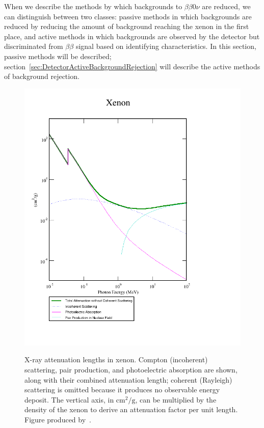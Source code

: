 When we describe the methods by which backgrounds to $\beta\beta 0\nu$ are reduced, we can distinguish between two classes: passive methods in which backgrounds are reduced by reducing the amount of background reaching the xenon in the first place, and active methods in which backgrounds are observed by the detector but discriminated from $\beta\beta$ signal based on identifying characteristics.  In this section, passive methods will be described; section~\ref{sec:DetectorActiveBackgroundRejection} will describe the active methods of background rejection.

\begin{figure}
\begin{center}
\includegraphics[keepaspectratio=true,width=\textwidth]{XrayAttenuationXenon.png}
\end{center}
\renewcommand{\baselinestretch}{1}
\small\normalsize
\begin{quote}
\caption{X-ray attenuation lengths in xenon.  Compton (incoherent) scattering, pair production, and photoelectric absorption are shown, along with their combined attenuation length; coherent (Rayleigh) scattering is omitted because it produces no observable energy deposit.  The vertical axis, in $\text{cm}^2/\text{g}$, can be multiplied by the density of the xenon to derive an attenuation factor per unit length.  Figure produced by~\cite{XcomXenonAttenuation}.}
\label{fig:XrayAttenuationXenon}
\end{quote}
\end{figure}
\renewcommand{\baselinestretch}{2}
\small\normalsize

